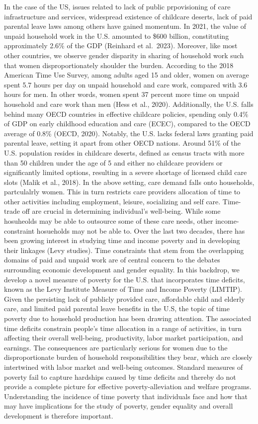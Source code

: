 \documentclass[
  11pt,
]{article}
\begin{document}
In the case of the US, issues related to lack of public prpovisioning of
care infrastructure and services, widespread existence of childcare
deserts, lack of paid parental leave laws among others have gained
momentum. In 2021, the value of unpaid household work in the U.S.
amounted to \$600 billion, constituting approximately 2.6\% of the GDP
(Reinhard et al.~2023). Moreover, like most other countries, we observe
gender disparity in sharing of household work such that women
disproportionately shoulder the burden. According to the 2018 American
Time Use Survey, among adults aged 15 and older, women on average spent
5.7 hours per day on unpaid household and care work, compared with 3.6
hours for men. In other words, women spent 37 percent more time on
unpaid household and care work than men (Hess et al., 2020).
Additionally, the U.S. falls behind many OECD countries in effective
childcare policies, spending only 0.4\% of GDP on early childhood
education and care (ECEC), compared to the OECD average of 0.8\% (OECD,
2020). Notably, the U.S. lacks federal laws granting paid parental
leave, setting it apart from other OECD nations. Around 51\% of the U.S.
population resides in childcare deserts, defined as census tracts with
more than 50 children under the age of 5 and either no childcare
providers or significantly limited options, resulting in a severe
shortage of licensed child care slots (Malik et al., 2018). In the above
setting, care demand falls onto households, partculalrly women. This in
turn restricts care providers allocation of time to other activities
including employment, leisure, socializing and self care. Time-trade off
are crucial in determining individual's well-being. While some
hosuheolds may be able to outsource some of these care needs, other
income-constraint hosueholds may not be able to. Over the last two
decades, there has been growing interest in studying time and income
poverty and in developing their linkages (Levy studies). Time
constraints that stem from the overlapping domains of paid and unpaid
work are of central concern to the debates surrounding economic
development and gender equality. In this backdrop, we develop a novel
measure of poverty for the U.S. that incorporates time deficits, known
as the Levy Institute Measure of Time and Income Poverty (LIMTIP). Given
the persisting lack of publicly provided care, affordable child and
elderly care, and limited paid parental leave benefits in the U.S, the
topic of time poverty due to household production has been drawing
attention. The associated time deficits constrain people's time
allocation in a range of activities, in turn affecting their overall
well-being, productivity, labor market participation, and earnings. The
consequences are particularly serious for women due to the
disproportionate burden of household responsibilities they bear, which
are closely intertwined with labor market and well-being outcomes.
Standard measures of poverty fail to capture hardships caused by time
deficits and thereby do not provide a complete picture for effective
poverty-alleviation and welfare programs. Understanding the incidence of
time poverty that individuals face and how that may have implications
for the study of poverty, gender equality and overall development is
therefore important.
\end{document}
